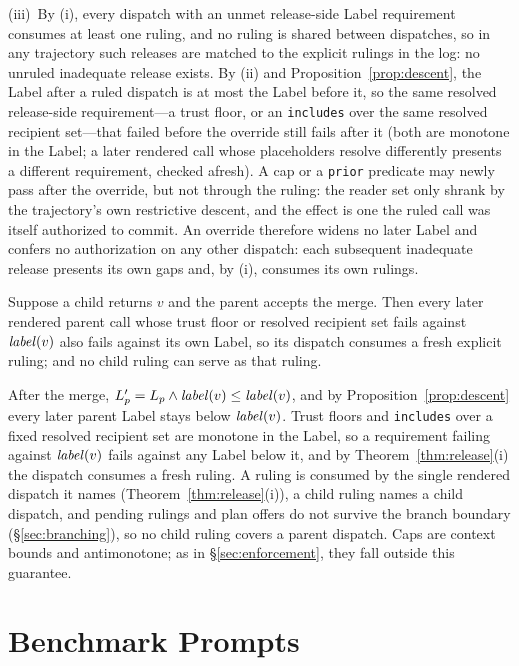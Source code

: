 (iii)~By (i), every dispatch with an unmet release-side Label requirement consumes at least one ruling, and no ruling is shared between dispatches, so in any trajectory such releases are matched to the explicit rulings in the log: no unruled inadequate release exists. By (ii) and Proposition~\ref{prop:descent}, the Label after a ruled dispatch is at most the Label before it, so the same resolved release-side requirement---a trust floor, or an \texttt{includes} over the same resolved recipient set---that failed before the override still fails after it (both are monotone in the Label; a later rendered call whose placeholders resolve differently presents a different requirement, checked afresh). A cap or a \texttt{prior} predicate may newly pass after the override, but not through the ruling: the reader set only shrank by the trajectory's own restrictive descent, and the effect is one the ruled call was itself authorized to commit. An override therefore widens no later Label and confers no authorization on any other dispatch: each subsequent inadequate release presents its own gaps and, by (i), consumes its own rulings.

\begin{corollary}\label{cor:export}
Suppose a child returns $v$ and the parent accepts the merge. Then every later rendered parent call whose trust floor or resolved recipient set fails against $\mathit{label}(v)$ also fails against its own Label, so its dispatch consumes a fresh explicit ruling; and no child ruling can serve as that ruling.
\end{corollary}
After the merge, $L_p'=L_p\wedge\mathit{label}(v)\le\mathit{label}(v)$, and by Proposition~\ref{prop:descent} every later parent Label stays below $\mathit{label}(v)$. Trust floors and \texttt{includes} over a fixed resolved recipient set are monotone in the Label, so a requirement failing against $\mathit{label}(v)$ fails against any Label below it, and by Theorem~\ref{thm:release}(i) the dispatch consumes a fresh ruling. A ruling is consumed by the single rendered dispatch it names (Theorem~\ref{thm:release}(i)), a child ruling names a child dispatch, and pending rulings and plan offers do not survive the branch boundary (\S\ref{sec:branching}), so no child ruling covers a parent dispatch. Caps are context bounds and antimonotone; as in \S\ref{sec:enforcement}, they fall outside this guarantee.

\section{Benchmark Prompts}\label{app:benchmark-prompts}

